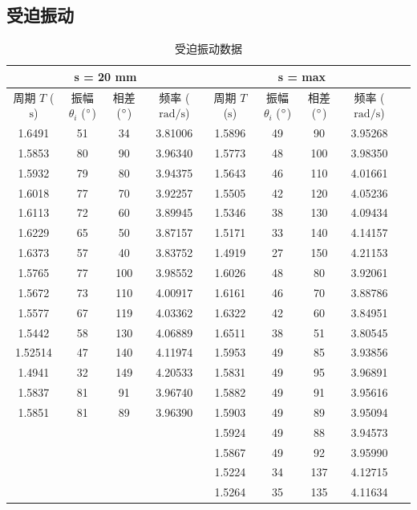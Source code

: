 \documentclass{THUexprep}
\begin{document}
\newpage

\subsection{受迫振动}

\begin{longtable}{|c|c|c|c|c|c|c|c|c|}
  \caption{受迫振动数据} \\
    \hline
    \multicolumn{4}{|c|}{s = 20 mm} & \multicolumn{4}{c|}{s = max} \\ \cline{1-9}
    \hline
    周期 $T$ ($\text{s}$) & 振幅 $\theta_i$ ($\degree$) & 相差 ($\degree$) & 频率 ($\text{rad/s}$) & 周期 $T$ ($\text{s}$) & 振幅 $\theta_i$ ($\degree$) & 相差 ($\degree$) & 频率 ($\text{rad/s}$) \\
    \hline
    1.6491 & 51    & 34    & 3.81006 & 1.5896 & 49    & 90    & 3.95268 \\
    \hline
    1.5853 & 80    & 90    & 3.96340 & 1.5773 & 48    & 100   & 3.98350 \\
    \hline
    1.5932 & 79    & 80    & 3.94375 & 1.5643 & 46    & 110   & 4.01661 \\
    \hline
    1.6018 & 77    & 70    & 3.92257 & 1.5505 & 42    & 120   & 4.05236 \\
    \hline
    1.6113 & 72    & 60    & 3.89945 & 1.5346 & 38    & 130   & 4.09434 \\
    \hline
    1.6229 & 65    & 50    & 3.87157 & 1.5171 & 33    & 140   & 4.14157 \\
    \hline
    1.6373 & 57    & 40    & 3.83752 & 1.4919 & 27    & 150   & 4.21153 \\
    \hline
    1.5765 & 77    & 100   & 3.98552 & 1.6026 & 48    & 80    & 3.92061 \\
    \hline
    1.5672 & 73    & 110   & 4.00917 & 1.6161 & 46    & 70    & 3.88786 \\
    \hline
    1.5577 & 67    & 119   & 4.03362 & 1.6322 & 42    & 60    & 3.84951 \\
    \hline
    1.5442 & 58    & 130   & 4.06889 & 1.6511 & 38    & 51    & 3.80545 \\
    \hline
    1.52514 & 47    & 140   & 4.11974 & 1.5953 & 49    & 85    & 3.93856 \\
    \hline
    1.4941 & 32    & 149   & 4.20533 & 1.5831 & 49    & 95    & 3.96891 \\
    \hline
    1.5837 & 81    & 91    & 3.96740 & 1.5882 & 49    & 91    & 3.95616 \\
    \hline
    1.5851 & 81    & 89    & 3.96390 & 1.5903 & 49    & 89    & 3.95094 \\
    \hline
           &       &       &       & 1.5924 & 49    & 88    & 3.94573 \\
    \hline
           &       &       &       & 1.5867 & 49    & 92    & 3.95990 \\
    \hline
           &       &       &       & 1.5224 & 34    & 137   & 4.12715 \\
    \hline
           &       &       &       & 1.5264 & 35    & 135   & 4.11634 \\
    \hline
\end{longtable}
\end{document}
